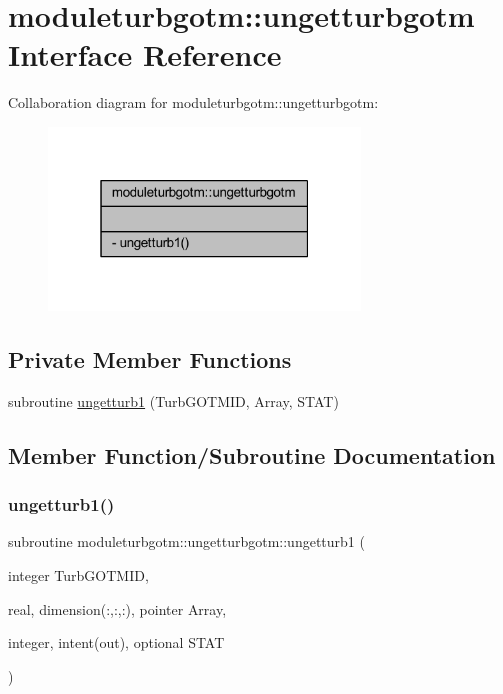 \hypertarget{interfacemoduleturbgotm_1_1ungetturbgotm}{}\section{moduleturbgotm\+:\+:ungetturbgotm Interface Reference}
\label{interfacemoduleturbgotm_1_1ungetturbgotm}


Collaboration diagram for moduleturbgotm\+:\+:ungetturbgotm\+:\nopagebreak
\begin{figure}[H]
\begin{center}
\leavevmode
\includegraphics[width=235pt]{interfacemoduleturbgotm_1_1ungetturbgotm__coll__graph}
\end{center}
\end{figure}
\subsection*{Private Member Functions}
\begin{DoxyCompactItemize}
\item 
subroutine \mbox{\hyperlink{interfacemoduleturbgotm_1_1ungetturbgotm_aacfc4581a05c9a3a6a8ba610a64befa4}{ungetturb1}} (Turb\+G\+O\+T\+M\+ID, Array, S\+T\+AT)
\end{DoxyCompactItemize}


\subsection{Member Function/\+Subroutine Documentation}
\mbox{\label{interfacemoduleturbgotm_1_1ungetturbgotm_aacfc4581a05c9a3a6a8ba610a64befa4}} 
\subsubsection{\texorpdfstring{ungetturb1()}{ungetturb1()}}
{\footnotesize\ttfamily subroutine moduleturbgotm\+::ungetturbgotm\+::ungetturb1 (\begin{DoxyParamCaption}\item[{integer}]{Turb\+G\+O\+T\+M\+ID,  }\item[{real, dimension(\+:,\+:,\+:), pointer}]{Array,  }\item[{integer, intent(out), optional}]{S\+T\+AT }\end{DoxyParamCaption})\hspace{0.3cm}{\ttfamily [private]}}



